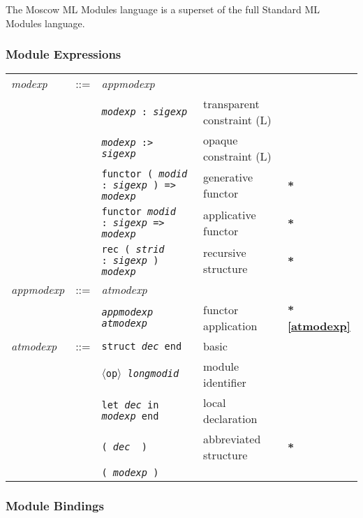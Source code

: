 \documentclass[fleqn]{article}
\newcommand{\x}[1][]{{\bf{*}#1}}
\newcommand{\la}{$\langle$}
\newcommand{\ra}{$\rangle$}
\newcommand{\opop}{\la{\tt op}\ra}
\begin{document}
The Moscow ML Modules language is a superset of the full Standard ML Modules language.

\subsubsection*{Module Expressions}

\begin{tabular}{@{}lllll}
{\it modexp\/} & ::= & {\it appmodexp\/}\\
& & {\tt {\it modexp\/} :\ {\it sigexp\/}} & transparent constraint (L)\\
& & {\tt {\it modexp\/} :> {\it sigexp\/}} & opaque constraint (L)\\
& & {\tt functor ( {\it modid\/} :\ {\it sigexp} ) => {\it modexp}}  & generative functor & \x \\
& & {\tt functor {\it modid\/} :\ {\it sigexp\/} => {\it modexp}}  & applicative functor & \x \\
& & {\tt rec ( {\it strid\/} :\ {\it sigexp} ) {\it modexp}}  & recursive structure& \x \\[2ex]

{\it appmodexp\/} & ::= & {\it atmodexp\/}\\
& & {\tt {\it appmodexp\/} {\it atmodexp\/}} & functor application&\x[\ref{atmodexp}] \\[2ex]

{\it atmodexp\/} & ::= & {\tt struct {\it dec\/} end} & basic\\
& & {\tt \opop\ {\it longmodid\/}}& module identifier\\
& & {\tt let {\it dec\/} in {\it modexp\/} end} & local declaration\\
& & {\tt ( {\it dec \/} )} & abbreviated structure & \x \\
& & {\tt ( {\it modexp\/} )} \\
\end{tabular}

\subsubsection*{Module Bindings}
\end{document}
